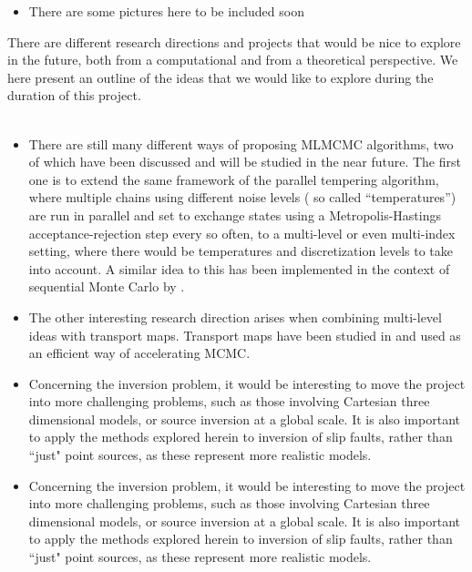 \begin{itemize}
\item There are some pictures here to be included soon \color{black}\\
\end{itemize}
\noindent There are different research directions and projects that would be nice to explore in the future, both from a computational and from a theoretical perspective. We here present an outline of the ideas that we would like to explore during the duration of this project. \\ \\ \noindent 
\begin{itemize}
	\item There are still many different ways of proposing MLMCMC algorithms, two of which have been discussed and will be studied in the near future. The first one is to extend the same framework of the parallel tempering algorithm, where multiple chains using different noise levels ( so called ``temperatures'') are run in parallel and set to exchange states using a Metropolis-Hastings acceptance-rejection step every so often, to a multi-level or even multi-index setting, where there would be temperatures and discretization levels to take into account. A similar idea to this has been implemented in the context of sequential Monte Carlo by \cite{latz2017multilevel}. 
	\item The other interesting research direction arises when combining multi-level ideas with transport maps. Transport maps have been studied in \cite{marzouk2016introduction,parno2016multiscale,parno2018transport} and used as an efficient way of accelerating  MCMC.\\ 
	\item Concerning the inversion problem, it would be interesting to move the project into more challenging problems, such as those involving Cartesian three dimensional models, or source inversion at a global scale. It is also important to apply the methods explored herein to inversion of slip faults, rather than ``just" point sources, as these represent more realistic models. 
	\item Concerning the inversion problem, it would be interesting to move the project into more challenging problems, such as those involving Cartesian three dimensional models, or source inversion at a global scale. It is also important to apply the methods explored herein to inversion of slip faults, rather than ``just" point sources, as these represent more realistic models. 

\end{itemize}
